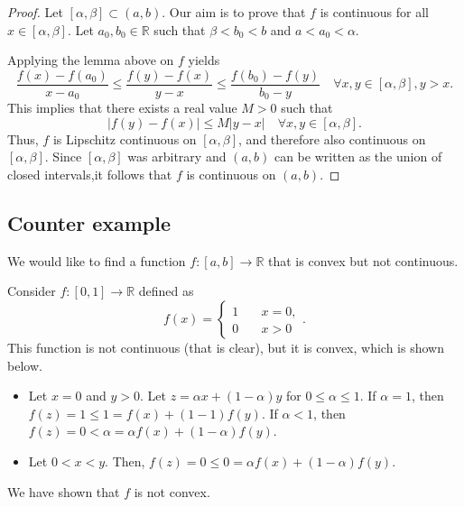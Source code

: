 \documentclass[12pt,letterpaper]{article}
\begin{document}
\begin{proof}
    Let $[\alpha,\beta] \subset (a,b)$. Our aim is to prove that $f$ is continuous for all $x \in [\alpha,\beta]$. Let $a_0,b_0 \in \mathbb{R}$ such that $\beta < b_0 < b$ and $a < a_0 < \alpha$.

    Applying the lemma above on $f$ yields 
    \[
        \frac{f(x)-f(a_0)}{x-a_0} \leq \frac{f(y)-f(x)}{y-x} \leq \frac{f(b_0)-f(y)}{b_0-y} \quad \forall x,y \in [\alpha,\beta], y > x.
    \]
    This implies that there exists a real value $M > 0$ such that
    \[
        |f(y) - f(x)| \leq M |y-x| \quad \forall x,y \in [\alpha, \beta].
    \]
    Thus, $f$ is Lipschitz continuous on $[\alpha, \beta]$, and therefore also continuous on $[\alpha, \beta]$. Since $[\alpha, \beta]$ was arbitrary and $(a,b)$ can be written as the union of closed intervals,it follows that $f$ is continuous on $(a,b)$.
\end{proof}

\subsection*{Counter example}
We would like to find a function $f: [a,b] \to \mathbb{R}$ that is convex but not continuous. 

Consider $f: [0,1] \to \mathbb R$ defined as 
\[
    f(x) = 
    \begin{cases}
        1 \quad &x = 0, \\
        0 &{x > 0}
    \end{cases}.
\]
This function is not continuous (that is clear), but it is convex, which is shown below.
\begin{itemize}
    \item Let $x = 0$ and $y > 0$. Let $z = \alpha x + (1 - \alpha) y$ for $0 \leq \alpha \leq 1$. If $\alpha = 1$, then $f(z) = 1 \leq 1 = f(x) + (1 - 1)f(y) $.  If $\alpha < 1$, then $f(z) = 0 < \alpha = \alpha f(x) + (1 - \alpha) f(y)$.

    \item Let $0 < x < y$. Then, $f(z) = 0 \leq 0 = \alpha f(x) + (1-\alpha)f(y)$.
\end{itemize}
We have shown that $f$ is not convex.
\end{document}
